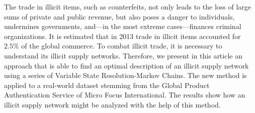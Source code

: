 
The trade in illicit items, such as counterfeits, not only leads to the loss of large sums of private and public revenue, but also poses a danger to individuals, undermines governments, and---in the most extreme cases---finances criminal organizations. It is estimated that in 2013 trade in illicit items accounted for $2.5\%$ of the global commerce. To combat illicit trade, it is necessary to understand its illicit supply networks. Therefore, we present in this article an approach that is able to find an optimal description of an illicit supply network using a series of Variable State Resolution-Markov Chains. The new method is applied to a real-world dataset stemming from the Global Product Authentication Service of Micro Focus International. The results show how an illicit supply network might be analyzed with the help of this method.


